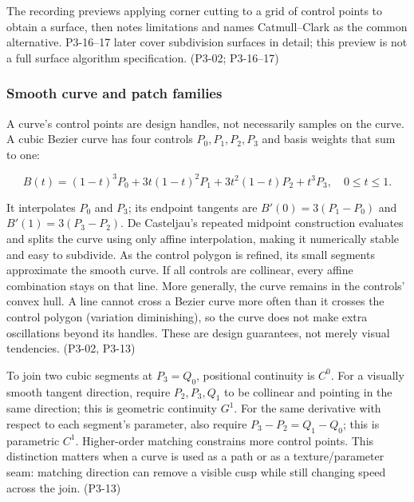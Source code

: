 The recording previews applying corner cutting to a grid of control points to obtain a surface, then notes limitations and names Catmull--Clark as the common alternative. P3-16--17 later cover subdivision surfaces in detail; this preview is not a full surface algorithm specification. (P3-02; P3-16--17)

\subsubsection{Smooth curve and patch families}\label{03-visual-computing-i-ch001-smooth-curve-and-patch-families}

A curve's control points are design handles, not necessarily samples on the curve. A cubic Bezier curve has four controls \(P_0,P_1,P_2,P_3\) and basis weights that sum to one:

\[
B(t)=(1-t)^3P_0+3t(1-t)^2P_1+3t^2(1-t)P_2+t^3P_3,\quad 0\le t\le1.
\]

It interpolates \(P_0\) and \(P_3\); its endpoint tangents are \(B'(0)=3(P_1-P_0)\) and \(B'(1)=3(P_3-P_2)\). De Casteljau's repeated midpoint construction evaluates and splits the curve using only affine interpolation, making it numerically stable and easy to subdivide. As the control polygon is refined, its small segments approximate the smooth curve. If all controls are collinear, every affine combination stays on that line. More generally, the curve remains in the controls' convex hull. A line cannot cross a Bezier curve more often than it crosses the control polygon (variation diminishing), so the curve does not make extra oscillations beyond its handles. These are design guarantees, not merely visual tendencies. (P3-02, P3-13)

To join two cubic segments at \(P_3=Q_0\), positional continuity is \(C^0\). For a visually smooth tangent direction, require \(P_2,P_3,Q_1\) to be collinear and pointing in the same direction; this is geometric continuity \(G^1\). For the same derivative with respect to each segment's parameter, also require \(P_3-P_2=Q_1-Q_0\); this is parametric \(C^1\). Higher-order matching constrains more control points. This distinction matters when a curve is used as a path or as a texture/parameter seam: matching direction can remove a visible cusp while still changing speed across the join. (P3-13)

